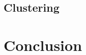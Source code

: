 \documentclass[12pt]{iopart}
\begin{document}







\subsection{Clustering}




\section{Conclusion}
\end{document}
